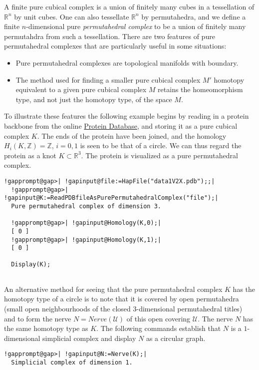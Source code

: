 \documentclass[a4paper,11pt]{report}
\begin{document}
{{A finite pure cubical complex is a union of finitely many cubes in a
tessellation of $\mathbb R^n$ by unit cubes. One can also tessellate $\mathbb R^n$ by permutahedra, and we define a finite $n$-dimensional pure \emph{permutahedral complex} to be a union of finitely many permutahdra from such a tessellation. There are
two features of pure permutahedral complexes that are particularly useful in
some situations: 
\begin{itemize}
\item  Pure permutahedral complexes are topological manifolds with boundary. 
\item  The method used for finding a smaller pure cubical complex $M'$ homotopy equivalent to a given pure cubical complex $M$ retains the homeomorphism type, and not just the homotopy type, of the space $M$.
\end{itemize}
 To illustrate these features the following example begins by reading in a
protein backbone from the online \href{https://www.rcsb.org/} {Protein Database}, and storing it as a pure cubical complex $K$. The ends of the protein have been joined, and the homology $H_i(K,\mathbb Z)=\mathbb Z$, $i=0,1$ is seen to be that of a circle. We can thus regard the protein as a knot $K\subset \mathbb R^3$. The protein is visualized as a pure permutahedral complex. 
\begin{Verbatim}[commandchars=!@|,fontsize=\small,frame=single,label=Example]
  !gapprompt@gap>| !gapinput@file:=HapFile("data1V2X.pdb");;|
  !gapprompt@gap>| !gapinput@K:=ReadPDBfileAsPurePermutahedralComplex("file");|
  Pure permutahedral complex of dimension 3.
  
  !gapprompt@gap>| !gapinput@Homology(K,0);|
  [ 0 ]
  !gapprompt@gap>| !gapinput@Homology(K,1);|
  [ 0 ]
  
  Display(K);
  
\end{Verbatim}
  

An alternative method for seeing that the pure permutahedral complex $K$ has the homotopy type of a circle is to note that it is covered by open
permutahedra (small open neighbourhoods of the closed $3$-dimensional permutahedral titles) and to form the nerve $N=Nerve({\mathcal U})$ of this open covering $\mathcal U$. The nerve $N$ has the same homotopy type as $K$. The following commands establish that $N$ is a $1$-dimensional simplicial complex and display $N$ as a circular graph. 
\begin{Verbatim}[commandchars=!@|,fontsize=\small,frame=single,label=Example]
  !gapprompt@gap>| !gapinput@N:=Nerve(K);|
  Simplicial complex of dimension 1.
  

\end{Verbatim}}}
\end{document}
